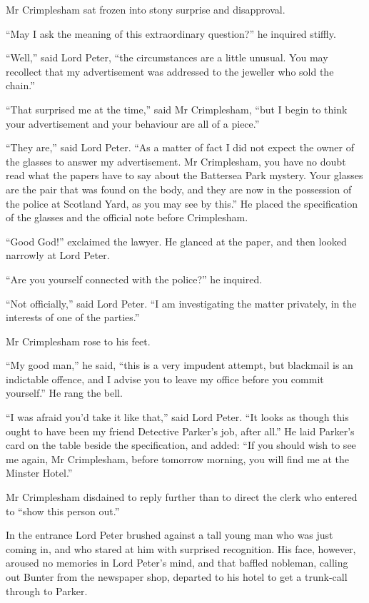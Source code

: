 Mr Crimplesham sat frozen into stony surprise and disapproval.

\enquote{May I ask the meaning of this extraordinary question?} he inquired stiffly.

\enquote{Well,} said Lord Peter, \enquote{the circumstances are a little unusual. You may recollect that my advertisement was addressed to the jeweller who sold the chain.}

\enquote{That surprised me at the time,} said Mr Crimplesham, \enquote{but I begin to think your advertisement and your behaviour are all of a piece.}

\enquote{They are,} said Lord Peter. \enquote{As a matter of fact I did not expect the owner of the glasses to answer my advertisement. Mr Crimplesham, you have no doubt read what the papers have to say about the Battersea Park mystery. Your glasses are the pair that was found on the body, and they are now in the possession of the police at Scotland Yard, as you may see by this.} He placed the specification of the glasses and the official note before Crimplesham.

\enquote{Good God!} exclaimed the lawyer. He glanced at the paper, and then looked narrowly at Lord Peter.

\enquote{Are you yourself connected with the police?} he inquired.

\enquote{Not officially,} said Lord Peter. \enquote{I am investigating the matter privately, in the interests of one of the parties.}

Mr Crimplesham rose to his feet.

\enquote{My good man,} he said, \enquote{this is a very impudent attempt, but blackmail is an indictable offence, and I advise you to leave my office before you commit yourself.} He rang the bell.

\enquote{I was afraid you’d take it like that,} said Lord Peter. \enquote{It looks as though this ought to have been my friend Detective Parker’s job, after all.} He laid Parker’s card on the table beside the specification, and added: \enquote{If you should wish to see me again, Mr Crimplesham, before tomorrow morning, you will find me at the Minster Hotel.}

Mr Crimplesham disdained to reply further than to direct the clerk who entered to \enquote{show this person out.}

In the entrance Lord Peter brushed against a tall young man who was just coming in, and who stared at him with surprised recognition. His face, however, aroused no memories in Lord Peter’s mind, and that baffled nobleman, calling out Bunter from the newspaper shop, departed to his hotel to get a trunk-call through to Parker.

